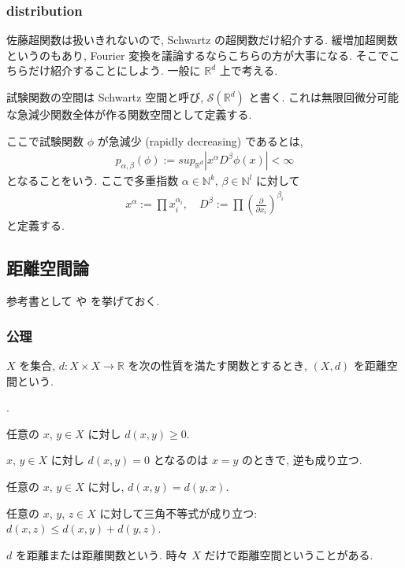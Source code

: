 \documentclass[openany, a4paper, oneside]{jsbook}
\newcounter{enum2}
\renewenvironment{enumerate}{%
\begin{list}%
{%
\arabic{enum2}.\ \,%
}%
{%
\usecounter{enum2}
\setlength{\itemindent}{0pt}%
\setlength{\leftmargin}{15pt}%
\setlength{\rightmargin}{0pt}%
\setlength{\labelsep}{0pt}%
\setlength{\labelwidth}{6pt}%
\setlength{\itemsep}{0pt}%
\setlength{\parsep}{0pt}%
\setlength{\listparindent}{0pt}%
}
}{%
\end{list}%
}
\theoremstyle{break}
\theoremstyle{breakdefn}
\begin{document}
\subsubsection{distribution}


佐藤超関数は扱いきれないので, Schwartz の超関数だけ紹介する.
緩増加超関数というのもあり, Fourier 変換を議論するならこちらの方が大事になる.
そこでこちらだけ紹介することにしよう.
一般に $\mathbb{R}^d$ 上で考える.

試験関数の空間は Schwartz 空間と呼び, $\mathcal{S} (\mathbb{R}^d)$ と書く.
これは無限回微分可能な急減少関数全体が作る関数空間として定義する.

ここで試験関数 $\phi$ が急減少 (rapidly decreasing) であるとは,
\begin{align}
 p_{\alpha, \beta} (\phi)
 :=
 sup_{\mathbb{R}^d} \left| x^{\alpha} D^{\beta} \phi (x) \right|
 < \infty
\end{align}
となることをいう.
ここで多重指数 $\alpha \in \mathbb{N}^k$, $\beta \in \mathbb{N}^l$ に対して
\begin{align}
 x^{\alpha}
 :=
 \prod x_i^{\alpha_i}, \quad
 D^{\beta}
 :=
 \prod \left ( \frac{\partial}{\partial x_i} \right)^{\beta_i}
\end{align}
と定義する.
\subsection{距離空間論}


参考書として \cite{ShigeoIchiraku1} や \cite{KazuoMatsuzaka1} を挙げておく.
\subsubsection{公理}


$X$ を集合, $d \colon X \times X \to \mathbb{R}$ を次の性質を満たす関数とするとき, $(X, d)$ を距離空間という.
\begin{enumerate}
\item 任意の $x$, $y \in X$ に対し $d (x, y) \geq 0$.
\item $x$, $y \in X$ に対し $d (x, y) = 0$ となるのは $x=y$ のときで, 逆も成り立つ.
\item 任意の $x$, $y \in X$ に対し, $d (x,y) = d (y,x)$.
\item 任意の $x$, $y$, $z \in X$ に対して三角不等式が成り立つ: $d (x,z) \leq d (x,y) + d (y,z)$.
\end{enumerate}
$d$ を距離または距離関数という.
時々 $X$ だけで距離空間ということがある.
\end{document}
